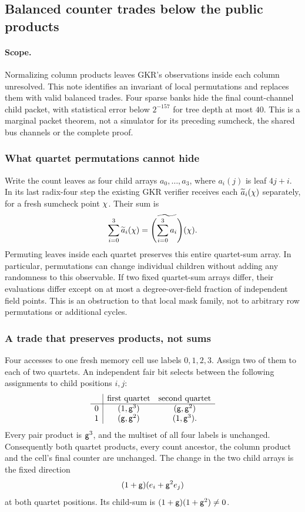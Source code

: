 \subsection{Balanced counter trades below the public products}\label{note:zk-count-children}

\paragraph{Scope.} Normalizing column products leaves GKR's observations inside each column unresolved. This note identifies an invariant of local permutations and replaces them with valid balanced trades. Four sparse banks hide the final count-channel child packet, with statistical error below $2^{-157}$ for tree depth at most $40$. This is a marginal packet theorem, not a simulator for its preceding sumcheck, the shared bus channels or the complete proof.

\subsubsection{What quartet permutations cannot hide}

Write the count leaves as four child arrays $a_0,\ldots,a_3$, where $a_i(j)$ is leaf $4j+i$. In its last radix-four step the existing GKR verifier receives each $\widetilde{a}_i(\chi)$ separately, for a fresh sumcheck point $\chi$. Their sum is
\[
 \sum_{i=0}^3\widetilde{a}_i(\chi)
 =\widetilde{\left(\sum_{i=0}^3 a_i\right)}(\chi).
\]
Permuting leaves inside each quartet preserves this entire quartet-sum array. In particular, permutations can change individual children without adding any randomness to this observable. If two fixed quartet-sum arrays differ, their evaluations differ except on at most a degree-over-field fraction of independent field points. This is an obstruction to that local mask family, not to arbitrary row permutations or additional cycles.

\subsubsection{A trade that preserves products, not sums}

Four accesses to one fresh memory cell use labels $0,1,2,3$. Assign two of them to each of two quartets. An independent fair bit selects between the following assignments to child positions $i,j$:
\[
\begin{array}{c|cc}
 &\text{first quartet}&\text{second quartet}\\ \hline
0 &(1,\mathsf{g}^3)&(\mathsf{g},\mathsf{g}^2)\\
1 &(\mathsf{g},\mathsf{g}^2)&(1,\mathsf{g}^3).
\end{array}
\]
Every pair product is $\mathsf{g}^3$, and the multiset of all four labels is unchanged. Consequently both quartet products, every count ancestor, the column product and the cell's final counter are unchanged. The change in the two child arrays is the fixed direction
\[
 (1+\mathsf{g})(e_i+\mathsf{g}^2 e_j)
\]
at both quartet positions. Its child-sum is $(1+\mathsf{g})(1+\mathsf{g}^2)\ne0$.

